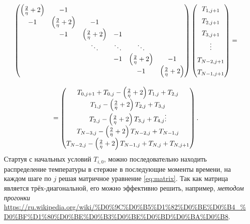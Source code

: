 \documentclass[12pt]{article}
\begin{document}
\begin{equation}
\begin{array}{c}
\begin{pmatrix}
\left(\frac{2}{\eta}+2\right) & -1 & \hphantom{1} & \hphantom{1} & \hphantom{1} & \hphantom{1}\\
-1 & \left(\frac{2}{\eta}+2\right) & -1 & \hphantom{1} & \hphantom{1} & \hphantom{1}\\
\hphantom{1} & -1 & \left(\frac{2}{\eta}+2\right) & -1 & \hphantom{1} & \hphantom{1}\\
\hphantom{1} & \hphantom{1} & \ddots & \ddots & \ddots & \hphantom{1}\\
\hphantom{1} & \hphantom{1} & \hphantom{1} & -1 & \left(\frac{2}{\eta}+2\right) & -1\\
\hphantom{1} & \hphantom{1} & \hphantom{1} & \hphantom{1} & -1 & \left(\frac{2}{\eta}+2\right)\\
\end{pmatrix}
\begin{pmatrix}
\vphantom{\left(\frac{2}{\eta}\right)} T_{1,j+1}\\
\vphantom{\left(\frac{2}{\eta}\right)} T_{2,j+1}\\
\vphantom{\left(\frac{2}{\eta}\right)} T_{3,j+1}\\
\vphantom{\left(\frac{2}{\eta}\right)} \vdots\\
\vphantom{\left(\frac{2}{\eta}\right)} T_{N-2,j+1}\\
\vphantom{\left(\frac{2}{\eta}\right)} T_{N-1,j+1}
\end{pmatrix}=\\
\hphantom{1111}\\
=\begin{pmatrix}
T_{0,j+1}+T_{0,j}-\left(\frac{2}{\eta}+2\right)T_{1,j}+T_{2,j}\\
T_{1,j}-\left(\frac{2}{\eta}+2\right)T_{2,j}+T_{3,j}\\
T_{2,j}-\left(\frac{2}{\eta}+2\right)T_{3,j}+T_{4,j}
\vphantom{\left(\frac{2}{\eta}\right)} \vdots\\
T_{N-3,j}-\left(\frac{2}{\eta}+2\right)T_{N-2,j}+T_{N-1,j}\\
T_{N-2,j}-\left(\frac{2}{\eta}+2\right)T_{N-1,j}+T_{N,j}+T_{N,j+1}
\end{pmatrix}.
\end{array}
\label{eq:matrix}
\end{equation}
%
Стартуя с начальных условий $T_{i,0}$, можно последовательно находить распределение температуры в стержне в последующие моменты времени, на каждом шаге по $j$ решая матричное уравнение \eqref{eq:matrix}. Так как матрица является трёх-диагональной, его можно эффективно решить, например, \textit{методом прогонки} \url{https://ru.wikipedia.org/wiki/%D0%9C%D0%B5%D1%82%D0%BE%D0%B4_%D0%BF%D1%80%D0%BE%D0%B3%D0%BE%D0%BD%D0%BA%D0%B8}.
\end{document}
